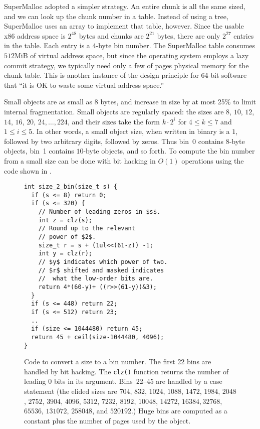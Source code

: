 \documentclass[pldi]{sigplanconf-pldi15}
\newcommand{\code}[1]{\texttt{#1}}
\begin{document}
SuperMalloc adopted a simpler strategy.  An entire chunk is all the
same sized, and we can look up the chunk number in a table.  Instead
of using a tree, SuperMalloc uses an array to implement that table,
however.  Since the usable x86 address space is $2^{48}$ bytes and
chunks are $2^{21}$ bytes, there are only $2^{27}$ entries in the
table.  Each entry is a 4-byte bin number.  The SuperMalloc table
consumes $512$MiB of virtual address space, but since the operating
system employs a lazy commit strategy, we typically need only a few of
pages physical memory for the chunk table.  This is another instance
of the design principle for 64-bit software that ``it is OK to waste
some virtual address space.''


Small objects are as small as 8 bytes, and increase in size by at most
25\% to limit internal fragmentation.  Small objects are regularly
spaced: the sizes are $8$, $10$, $12$, $14$, $16$, $20$, $24, \ldots,
224$, and their sizes take the form $k\cdot2^i$ for $4\leq k \leq 7$
and $1\leq i \leq 5$.  In other words, a small object size, when
written in binary is a $1$, followed by two arbitrary digits, followed
by zeros.  Thus bin~$0$ contains $8$-byte objects, bin~1 contains
$10$-byte objects, and so forth.  To compute the bin number from a
small size can be done with bit hacking in $O(1)$ operations using the
code shown in .

\begin{figure}
\begin{verbatim}
int size_2_bin(size_t s) {
  if (s <= 8) return 0;
  if (s <= 320) {
    // Number of leading zeros in $s$.
    int z = clz(s);
    // Round up to the relevant
    // power of $2$.
    size_t r = s + (1ul<<(61-z)) -1;
    int y = clz(r);
    // $y$ indicates which power of two.
    // $r$ shifted and masked indicates
    //  what the low-order bits are.
    return 4*(60-y)+ ((r>>(61-y))&3);
  }
  if (s <= 448) return 22;
  if (s <= 512) return 23;
  ..
  if (size <= 1044480) return 45;
  return 45 + ceil(size-1044480, 4096);
}
\end{verbatim}
\caption{Code to convert a size to a bin number.  The first 22 bins
  are handled by bit hacking. The \code{clz()} function returns the
  number of leading 0 bits in its argument. Bins~22--45 are handled by
  a case statement (the elided sizes are $704$, $832$, $1024$, $1088$,
  $1472$, $1984$, $2048$, $2752$, $3904$, $4096$, $5312$, $7232$,
  $8192$, $10048$, $14272$, $16384, 32768$, $65536$, $131072$,
  $258048$, and $520192$.)  Huge bins are computed as a constant plus
  the number of pages used by the object.}
\label{fig:size2bin}
\end{figure}
\end{document}
